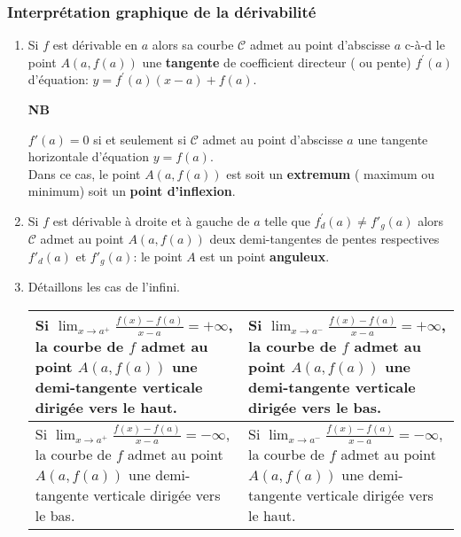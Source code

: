 \subsubsection*{Interprétation graphique de la dérivabilité}
\begin{enumerate}
\item Si $ f $ est dérivable en $ a $ alors sa courbe $ \mathcal{C} $ admet au point d'abscisse  $ a $  c-à-d le point $A(a,f(a))$ une \textbf{ tangente} de coefficient directeur ( ou pente) $  f^{'}(a)$ d'équation:  
$ y=f^{'}(a)(x-a)+ f(a) $.


\textbf{NB}

 $  f'(a)=0$  si et seulement si $ \mathcal{C} $ admet au point d'abscisse  $ a $ une tangente horizontale d'équation $ y=f(a). $ \\ Dans ce cas, le point $A(a,f(a))$  est  soit un \textbf{extremum} ( maximum ou minimum) soit un \textbf{point d'inflexion}.

 \item Si $ f $ est dérivable  à droite et à gauche  de $ a $ telle que $ f^{'}_{d}(a)\neq f'_{g}(a) $ alors $ \mathcal{C} $ admet au  point $A(a,f(a))$ deux demi-tangentes de pentes respectives  $ f'_{d}(a)$ et $ f'_{g}(a) $: le point $A$ est un point \textbf{anguleux}.
 \item Détaillons les cas de l'infini.

\medskip
\begin{tabularx}{\textwidth}{|X|X|}
\hline
Si $\displaystyle \lim_{x \to a^+} \frac{f(x)-f(a)}{x-a} = +\infty$, la courbe de $f$ admet au point $A(a, f(a))$ une demi-tangente verticale dirigée vers le haut. 
&
Si $\displaystyle \lim_{x \to a^-} \frac{f(x)-f(a)}{x-a} = +\infty$, la courbe de $f$ admet au point $A(a, f(a))$ une demi-tangente verticale dirigée vers le bas. 
\\
\hline
Si $\displaystyle \lim_{x \to a^+} \frac{f(x)-f(a)}{x-a} = -\infty$, la courbe de $f$ admet au point $A(a, f(a))$ une demi-tangente verticale dirigée vers le bas. 
&
Si $\displaystyle \lim_{x \to a^-} \frac{f(x)-f(a)}{x-a} = -\infty$, la courbe de $f$ admet au point $A(a, f(a))$ une demi-tangente verticale dirigée vers le haut. 
\\
\hline
\end{tabularx}


\end{enumerate}
